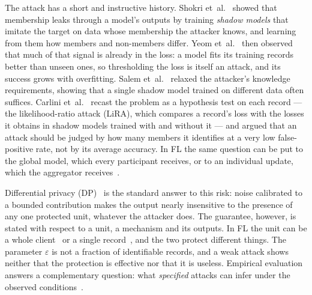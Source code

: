 The attack has a short and instructive history. Shokri
et~al.~\cite{shokri2017membership} showed that membership leaks through a
model's outputs by training \emph{shadow models} that imitate the target on
data whose membership the attacker knows, and learning from them how members
and non-members differ. Yeom et~al.~\cite{yeom2018privacy} then observed that
much of that signal is already in the loss: a model fits its training records
better than unseen ones, so thresholding the loss is itself an attack, and its
success grows with overfitting. Salem et~al.~\cite{salem2019mlleaks} relaxed
the attacker's knowledge requirements, showing that a single shadow model
trained on different data often suffices. Carlini
et~al.~\cite{carlini2022membership} recast the problem as a hypothesis test
on each record --- the likelihood-ratio attack (LiRA), which compares a
record's loss with the losses it obtains in shadow models trained with and
without it --- and argued that an attack should be judged by how many members
it identifies at a very low false-positive rate, not by its average accuracy.
In FL the same question can be put to the global model, which every
participant receives, or to an individual update, which the aggregator
receives~\cite{nasr2019comprehensive}.

Differential privacy (DP)~\cite{dwork2006calibrating,dwork2014algorithmic}
is the standard answer to this risk: noise calibrated to a bounded
contribution makes the output nearly insensitive to the presence of any one
protected unit, whatever the attacker does. The guarantee, however, is stated
with respect to a unit, a mechanism and its outputs. In FL the unit can be a
whole client~\cite{mcmahan2018learning} or a single record~\cite{abadi2016deep},
and the two protect different things. The parameter $\varepsilon$ is not a
fraction of identifiable records, and a weak attack shows neither that the
protection is effective nor that it is useless. Empirical evaluation answers
a complementary question: what \emph{specified} attacks can infer under the
observed conditions~\cite{jayaraman2019evaluating,jagielski2020auditing}.

